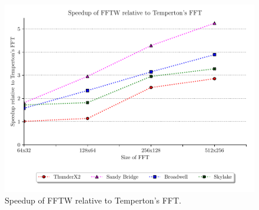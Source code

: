 \documentclass[a4paper,11pt]{report}
\begin{document}
\begin{figure}[htbp]
    \centering
    \includegraphics[width=1\textwidth]{img/speedup-fft.pdf}
    \caption[Speedup of FFTW relative to Temperton's FFT]{Speedup of FFTW relative to Temperton's FFT. }
    \label{fig:fft-speedup}
\end{figure}
\end{document}
